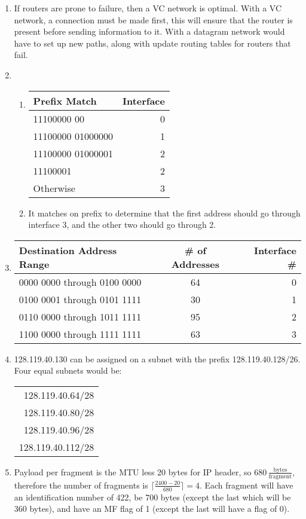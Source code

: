 \documentclass[12pt]{article}
\newcommand{\s}[1]{\setcounter{enumi}{#1}}
\newcommand{\unit}[1]{\ensuremath{\, \mathrm{#1}}}
\begin{document}
\begin{enumerate}
  \item If routers are prone to failure, then a VC network is optimal. With a VC network, a connection must be made first, this will ensure that the router is present before sending information to it. With a datagram network would have to set up new paths, along with update routing tables for routers that fail.

  \s{8}
  \item
    \begin{enumerate}
      \item
        \begin{tabular}{|l|r|}
          \hline
          Prefix Match & Interface \\ \hline
          11100000 00 & 0 \\
          11100000 01000000 & 1 \\
          11100000 01000001 & 2 \\
          11100001 & 2 \\
          Otherwise & 3\\ \hline
        \end{tabular}
      \item It matches on prefix to determine that the first address should go through interface 3, and the other two should go through 2.
    \end{enumerate}

  \item
    \begin{tabular}{|l|c|r|}
      \hline
      Destination Address Range & \# of Addresses & Interface \# \\ \hline
      0000 0000 through 0100 0000 & 64 & 0 \\
      0100 0001 through 0101 1111 & 30 & 1 \\
      0110 0000 through 1011 1111 & 95 & 2 \\
      1100 0000 through 1111 1111 & 63 & 3 \\ \hline
    \end{tabular}

  \s{14}
  \item 128.119.40.130 can be assigned on a subnet with the prefix 128.119.40.128/26. Four equal subnets would be: \\
    \begin{tabular}{r}
      128.119.40.64/28 \\
      128.119.40.80/28 \\
      128.119.40.96/28 \\
      128.119.40.112/28
    \end{tabular}

  \s{16}
  \item Payload per fragment is the MTU less 20 bytes for IP header, so $680 \unit{\frac{bytes}{fragment}}$, therefore the number of fragments is $\lceil\frac{2400-20}{680}\rceil = 4$. Each fragment will have an identification number of 422, be 700 bytes (except the last which will be 360 bytes), and have an MF flag of 1 (except the last will have a flag of 0).
\end{enumerate}
\end{document}
